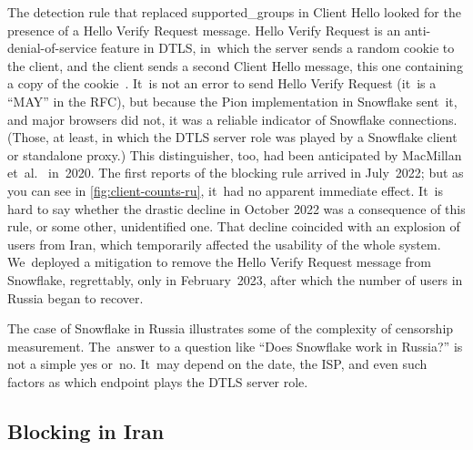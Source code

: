 \documentclass[letterpaper,twocolumn]{article}
\begin{document}

The detection rule that replaced \mbox{supported\_groups} in Client Hello
looked for the presence of a Hello Verify Request message.
Hello Verify Request is an anti-denial-of-service feature in DTLS,
in~which the server sends a random cookie to the client,
and the client sends a second Client Hello message,
this one containing a copy of the cookie~\cite[\S 5.1]{rfc9147}.
It~is not an error to send Hello Verify Request
(it~is a ``MAY'' in the RFC),
but because the Pion implementation in Snowflake sent~it,
and major browsers did not,
it was a reliable indicator of Snowflake connections.
(Those, at least, in which the DTLS server role was played by
a Snowflake client or standalone proxy.)
This distinguisher, too, had been anticipated by
MacMillan et~al.~\cite[\S 3]{arxiv.2008.03254} in~2020.
The first reports of the blocking rule arrived in July~2022;
but as you can see in \autoref{fig:client-counts-ru},
it~had no apparent immediate effect.
It~is hard to say whether the drastic decline in October 2022
was a consequence of this rule,
or some other, unidentified one.
That decline coincided with an explosion of users from Iran,
which temporarily affected the usability of the whole system.
We~deployed a mitigation to remove the Hello Verify Request message
from Snowflake, regrettably, only in February~2023, %
after which the number of users in Russia began to recover.

The case of Snowflake in Russia illustrates
some of the complexity of censorship measurement.
The~answer to a question like ``Does Snowflake work in Russia?''
is not a simple yes or~no.
It~may depend on the date, the ISP,
and even such factors as which endpoint plays the DTLS server role.

\subsection{Blocking in Iran}
\label{sec:block-ir}
\end{document}
